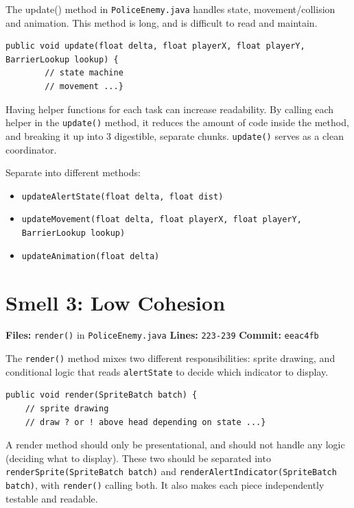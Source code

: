 \documentclass[10pt]{article}
\begin{document}
The update() method in \texttt{PoliceEnemy.java} handles state, movement/collision and animation. This method is long, and is difficult to read and maintain. 

\begin{lstlisting}
public void update(float delta, float playerX, float playerY, BarrierLookup lookup) {
        // state machine
        // movement ...}
\end{lstlisting}

Having  helper functions for each task can increase readability. By calling each helper in the \texttt{update()} method, it reduces the amount of code inside the method, and breaking it up into 3 digestible, separate chunks. \texttt{update()} serves as a clean coordinator.

Separate into different methods:
\begin{itemize}
    \item \texttt{updateAlertState(float delta, float dist)}
    \item \texttt{updateMovement(float delta, float playerX, float playerY, BarrierLookup lookup)}
    \item \texttt{updateAnimation(float delta)}
\end{itemize} 


\section{Smell 3: Low Cohesion}

\textbf{Files:} \texttt{render()} in \texttt{PoliceEnemy.java} \quad
\textbf{Lines:} \texttt{223-239} \quad
\textbf{Commit:} \texttt{eeac4fb}

The \texttt{render()} method mixes two different responsibilities: sprite drawing, 
and conditional logic that reads \texttt{alertState} to decide which indicator 
to display.

\begin{lstlisting}
public void render(SpriteBatch batch) {
	// sprite drawing
    // draw ? or ! above head depending on state ...}
\end{lstlisting}

A render method should only be presentational, and should not handle any logic (deciding what to display). These two should be separated into \texttt{renderSprite(SpriteBatch batch)} 
and \texttt{renderAlertIndicator(SpriteBatch batch)}, with \texttt{render()} 
calling both. It also makes each piece independently testable and readable.
\end{document}
